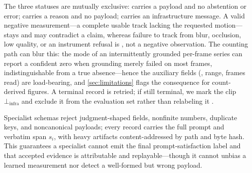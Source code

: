 The three statuses are mutually exclusive:  carries a payload and no abstention or error;  carries a reason and no payload;  carries an infrastructure message. A valid negative measurement---a complete usable track lacking the requested motion---stays  and may contradict a claim, whereas failure to track from blur, occlusion, low quality, or an instrument refusal is , not a negative observation. The counting path can blur this: the mode of an intermittently grounded per-frame series can report a confident zero when grounding merely failed on most frames, indistinguishable from a true absence---hence the auxiliary fields (, range, frames read) are load-bearing, and \cref{sec:limitations} flags the consequence for count-derived figures. A terminal  record is retried; if still terminal, we mark the clip $\bot_{\mathrm{infra}}$ and exclude it from the evaluation set rather than relabeling it \unknownv{}.

Specialist schemas reject judgment-shaped fields, nonfinite numbers, duplicate keys, and noncanonical payloads; every record carries the full prompt and verbatim span $s_i$, with heavy artifacts content-addressed by path and byte hash. This guarantees a specialist cannot emit the final prompt-satisfaction label and that accepted evidence is attributable and replayable---though it cannot unbias a learned measurement nor detect a well-formed but wrong payload.

